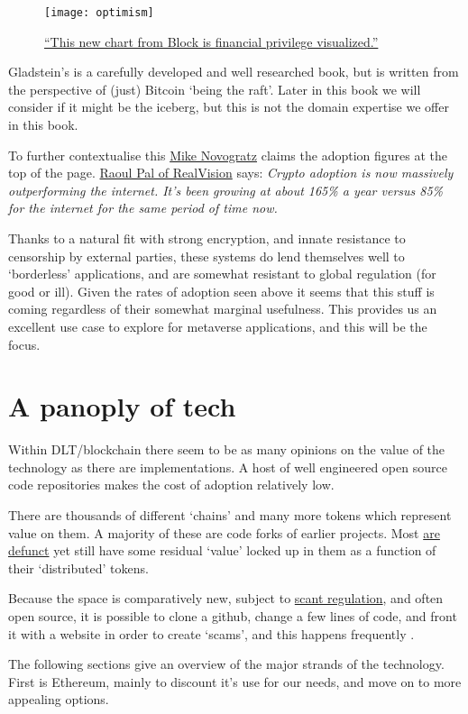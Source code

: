 \begin{figure*}[ht]\centering %
	\texttt{[image: optimism]}
	\caption{\href{https://twitter.com/gladstein/status/1532054253673406464}{``This new chart from Block is financial privilege visualized.''}}
	\label{fig:optimism}
\end{figure*}
Gladstein's is a carefully developed and well researched book, but is written from the perspective of (just) Bitcoin `being the raft'. Later in this book we will consider if it might be the iceberg, but this is not the domain expertise we offer in this book. \par
To further contextualise this \href{https://www.youtube.com/watch?v=BRQIMjZLMDk}{Mike Novogratz} claims the adoption figures at the top of the page. 
\href{https://dailyhodl.com/2022/05/04/crypto-winter-unlikely-as-astonishing-user-growth-dwarfs-internet-adoption-rate-macro-guru-raoul-pal/}{Raoul Pal of RealVision} says: \textit{Crypto adoption is now massively outperforming the internet. It’s been growing at about 165\% a year versus 85\% for the internet for the same period of time now.} \par
Thanks to a natural fit with strong encryption, and innate resistance to censorship by external parties, these systems do lend themselves well to `borderless' applications, and are somewhat resistant to global regulation (for good or ill). Given the rates of adoption seen above it seems that this stuff is coming regardless of their somewhat marginal usefulness. This provides us an excellent use case to explore for metaverse applications, and this will be the focus.

\section{A panoply of tech}
Within DLT/blockchain there seem to be as many opinions on the value of the technology as there are implementations. A host of well engineered open source code repositories makes the cost of adoption relatively low. \par%
There are thousands of different `chains' and many more tokens which represent value on them. A majority of these are code forks of earlier projects. Most \href{https://99bitcoins.com/deadcoins/}{are defunct} yet still have some residual `value' locked up in them as a function of their `distributed' tokens. \par 
Because the space is comparatively new, subject to \href{https://www.esma.europa.eu/press-news/consultations/call-evidence-dlt-pilot-regime}{scant regulation}, and often open source, it is possible to clone a github, change a few lines of code, and front it with a website in order to create `scams', and this happens frequently \cite{golumbia2020cryptocurrency}.\par
The following sections give an overview of the major strands of the technology. First is Ethereum, mainly to discount it's use for our needs, and move on to more appealing options.
